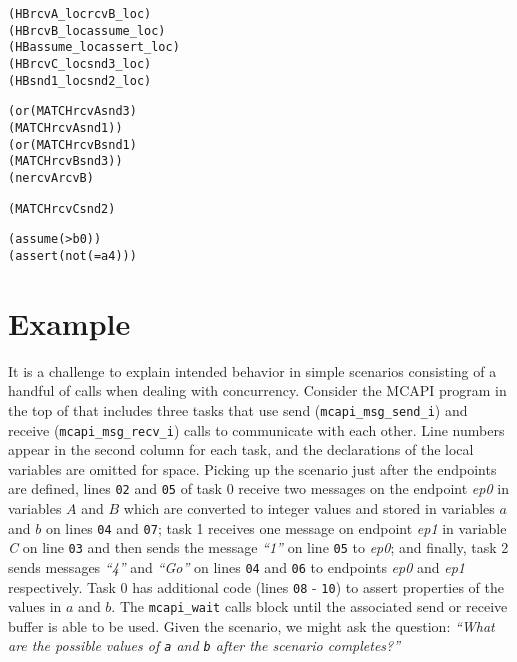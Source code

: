 \newsavebox{\boxSMT}
\begin{lrbox}{\boxSMT}
\begin{minipage}[c]{0.4\linewidth}
\begin{alltt}
(HB rcvA_loc rcvB_loc)
(HB rcvB_loc assume_loc)
(HB assume_loc assert_loc)
(HB rcvC_loc snd3_loc)
(HB snd1_loc snd2_loc)

(or (MATCH rcvA snd3)
    (MATCH rcvA snd1))
(or (MATCH rcvB  snd1)
    (MATCH rcvB snd3))
(ne rcvA rcvB)

(MATCH rcvC snd2)

(assume (> b 0))
(assert (not (= a 4)))
\end{alltt}
\end{minipage}
\end{lrbox}

\section{Example}

It is a challenge to explain intended behavior in simple scenarios
consisting of a handful of calls when dealing with concurrency. Consider
the MCAPI program in the top of  that includes three
tasks that use send (\texttt{mcapi\_msg\_send\_i}) and receive
(\texttt{mcapi\_msg\_recv\_i}) calls to communicate with each other.
Line numbers appear in the second column for each task, and the
declarations of the local variables are omitted for space. Picking up
the scenario just after the endpoints are defined, lines \texttt{02}
and \texttt{05} of task 0 receive two messages on the endpoint
\textit{ep0} in variables $A$ and $B$ which are
converted to integer values and stored in variables $a$ and
$b$ on lines \texttt{04} and \texttt{07}; task 1 receives one
message on endpoint \textit{ep1} in variable \textit{C} on line
\texttt{03} and then sends the message \textit{``1''} on line \texttt{05} to
\textit{ep0}; and finally, task 2 sends messages \textit{``4''} and \textit{``Go''} on
lines \texttt{04} and \texttt{06} to endpoints \textit{ep0} and
\textit{ep1} respectively. Task 0 has additional code (lines \texttt{08} -
\texttt{10}) to assert properties of the values in $a$ and
$b$. The \texttt{mcapi\_wait} calls block until the associated
send or receive buffer is able to be used. Given the scenario, we
might ask the question: \emph{``What are the possible values of
\texttt{a} and \texttt{b} after the scenario completes?''}

